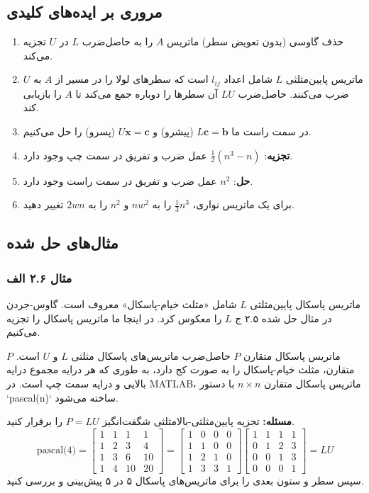 \documentclass[12pt, a4paper]{book}
\begin{document}
	\subsection*{مروری بر ایده‌های کلیدی}
	\begin{enumerate}
		\item حذف گاوسی (بدون تعویض سطر) ماتریس $A$ را به حاصل‌ضرب $L$ در $U$ تجزیه می‌کند.
		\item ماتریس پایین‌مثلثی $L$ شامل اعداد $l_{ij}$ است که سطرهای لولا را در مسیر از $A$ به $U$ ضرب می‌کنند. حاصل‌ضرب $LU$ آن سطرها را دوباره جمع می‌کند تا $A$ را بازیابی کند.
		\item در سمت راست ما $L\mathbf{c}=\mathbf{b}$ (پیشرو) و $U\mathbf{x}=\mathbf{c}$ (پسرو) را حل می‌کنیم.
		\item \textbf{تجزیه}: $\frac{1}{2}(n^3-n)$ عمل ضرب و تفریق در سمت چپ وجود دارد.
		\item \textbf{حل}: $n^2$ عمل ضرب و تفریق در سمت راست وجود دارد.
		\item برای یک ماتریس نواری، $\frac{1}{3}n^3$ را به $nw^2$ و $n^2$ را به $2wn$ تغییر دهید.
	\end{enumerate}
	
	\subsection*{مثال‌های حل شده}
	\subsubsection*{مثال ۲.۶ الف}
	ماتریس پاسکال پایین‌مثلثی $L$ شامل «مثلث خیام-پاسکال» معروف است. گاوس-جردن در مثال حل شده ۲.۵ ج $L$ را معکوس کرد. در اینجا ما ماتریس پاسکال را تجزیه می‌کنیم.
	
	ماتریس پاسکال متقارن $P$ حاصل‌ضرب ماتریس‌های پاسکال مثلثی $L$ و $U$ است. $P$ متقارن، مثلث خیام-پاسکال را به صورت کج دارد، به طوری که هر درایه مجموع درایه بالایی و درایه سمت چپ است. در MATLAB، ماتریس پاسکال متقارن $n \times n$ با دستور `pascal(n)` ساخته می‌شود.
	
	\textbf{مسئله:} تجزیه پایین‌مثلثی-بالامثلثی شگفت‌انگیز $P=LU$ را برقرار کنید.
	\[ \text{pascal(4)} = \begin{bmatrix} 1 & 1 & 1 & 1 \\ 1 & 2 & 3 & 4 \\ 1 & 3 & 6 & 10 \\ 1 & 4 & 10 & 20 \end{bmatrix} = \begin{bmatrix} 1 & 0 & 0 & 0 \\ 1 & 1 & 0 & 0 \\ 1 & 2 & 1 & 0 \\ 1 & 3 & 3 & 1 \end{bmatrix} \begin{bmatrix} 1 & 1 & 1 & 1 \\ 0 & 1 & 2 & 3 \\ 0 & 0 & 1 & 3 \\ 0 & 0 & 0 & 1 \end{bmatrix} = LU \]
	سپس سطر و ستون بعدی را برای ماتریس‌های پاسکال ۵ در ۵ پیش‌بینی و بررسی کنید.
	
\end{document}
